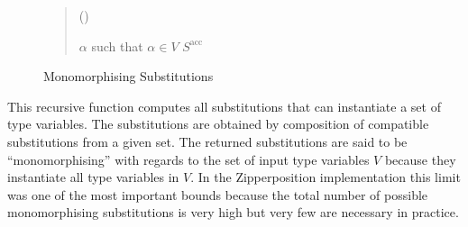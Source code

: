 \documentclass[]{ceurart}
\begin{document}
\begin{figure}
\begin{quote}
   \begin{algorithm}[H]

   

   \Fn(){}{


   \BlankLine

   \eIf{\(V = \emptyset\)}{
    \Return \(S^\text{acc}\cup\{\sigma^\text{acc}\}\)\;%
   }
   {
      \Let \(\alpha \) such that \(\alpha\in V\)\;
      \Return \(S^\text{acc}\)\;
   }
   }


\end{algorithm}
\end{quote}
\caption{Monomorphising Substitutions}
\end{figure}

This recursive function computes all substitutions that can instantiate a set of type variables. The substitutions are obtained by composition of compatible substitutions from a given set. The returned substitutions are said to be ``monomorphising'' with regards to the set of input type variables \(V\) because they instantiate all type variables in \(V\). In the Zipperposition implementation this limit was one of the most important bounds because the total number of possible monomorphising substitutions is very high but very few are necessary in practice.
\end{document}

